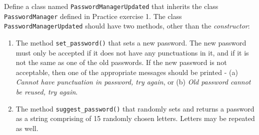\documentclass[
  letterpaper,
  DIV=11,
  numbers=noendperiod]{scrreprt}
\begin{document}
Define a class named \texttt{PasswordManagerUpdated} that inherits the
class \texttt{PasswordManager} defined in Practice exercise 1. The class
\texttt{PasswordManagerUpdated} should have two methods, other than the
\emph{constructor}:

\begin{enumerate}
\def\labelenumi{\arabic{enumi}.}
\item
  The method \texttt{set\_password()} that sets a new password. The new
  password must only be accepted if it does not have any punctuations in
  it, and if it is not the same as one of the old passwords. If the new
  password is not acceptable, then one of the appropriate messages
  should be printed - (a) \emph{Cannot have punctuation in password, try
  again}, or (b) \emph{Old password cannot be reused, try again}.
\item
  The method \texttt{suggest\_password()} that randomly sets and returns
  a password as a string comprising of 15 randomly chosen letters.
  Letters may be repeated as well.
\end{enumerate}
\end{document}
